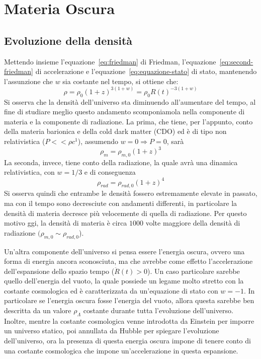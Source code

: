 \section{Materia Oscura}\label{sec:materia-oscura}
\subsection{Evoluzione della densità}\label{sec:evoluazione-densita}
Mettendo insieme l'equazione~\ref{eq:friedman} di Friedman, l'equazione~\ref{eq:second-friedman} di accelerazione e l'equazione~\ref{eq:equazione-stato} di stato, mantenendo l'assunzione che $w$ sia costante nel tempo, si ottiene che:
\[
    \rho = \rho_0 {(1+z)}^{3(1+w)} = \rho_0 {R(t)}^{-3(1+w)}
\]
Si osserva che la densità dell'universo sta diminuendo all'aumentare del tempo, al fine di studiare meglio questo andamento scomponiamola nella componente di materia e la componente di radiazione. La prima, che tiene, per l'appunto, conto della materia barionica e della cold dark matter (CDO) ed è di tipo non relativistica ($P<<\rho c^1$), assumendo $w = 0 \Rightarrow P=0$, sarà
\[
    \rho_m = \rho_{m,0}{(1+z)}^3
\]
La seconda, invece, tiene conto della radiazione, la quale avrà una dinamica relativistica, con $w = 1/3$ e di conseguenza
\[
    \rho_{rad} = \rho_{rad, 0}{(1+z)}^4
\]
Si osserva quindi che entrambe le densità fossero estremamente elevate in passato, ma con il tempo sono decresciute con andamenti differenti, in particolare la densità di materia decresce più velocemente di quella di radiazione. Per questo motivo ggi, la densità di materia è circa $1000$ volte maggiore della densità di radiazione $(\rho_{m,0} \sim \rho_{rad, 0}$).

Un'altra componente dell'universo si pensa essere l'energia oscura, ovvero una forma di energia ancora sconosciuta, ma che avrebbe come effetto l'accelerazione dell'espansione dello spazio tempo ($\ddot{R}(t)>0$). Un caso particolare sarebbe quello dell'energia del vuoto, la quale possiede un legame molto stretto con la costante cosmologica ed è caratterizzata da un'equazione di stato con $w = -1$. In particolare se l'energia oscura fosse l'energia del vuoto, allora questa sarebbe ben descritta da un valore $\rho_{\Lambda}$ costante durante tutta l'evoluzione dell'universo. Inoltre, mentre la costante cosmologica venne introdotta da Einstein per imporre un universo statico, poi annullata da Hubble per spiegare l'evoluzione dell'universo, ora la presenza di questa energia oscura impone di tenere conto di una costante cosmologica che impone un'accelerazione in questa espansione.

